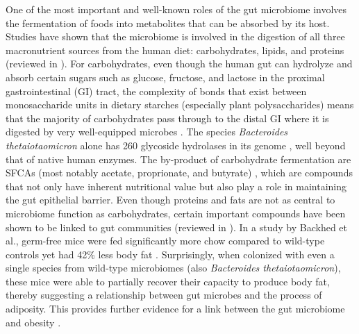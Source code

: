 One of the most important and well-known roles of the gut microbiome involves the fermentation of foods into metabolites that can be absorbed by its host. Studies have shown that the microbiome is involved in the digestion of all three macronutrient sources from the human diet: carbohydrates, lipids, and proteins (reviewed in \cite{oliphant2019macronutrient}). For carbohydrates, even though the human gut can hydrolyze and absorb certain sugars such as glucose, fructose, and lactose in the proximal gastrointestinal (GI) tract, the complexity of bonds that exist between monosaccharide units in dietary starches (especially plant polysaccharides) means that the majority of carbohydrates pass through to the distal GI where it is digested by very well-equipped microbes \cite{wong2006colonic}. The species \emph{Bacteroides thetaiotaomicron} alone has 260 glycoside hydrolases in its genome \cite{xu2003genomic}, well beyond that of native human enzymes. The by-product of carbohydrate fermentation are SFCAs (most notably acetate, proprionate, and butyrate) \cite{macfarlane2012bacteria}, which are compounds that not only have inherent nutritional value but also play a role in maintaining the gut epithelial barrier. Even though proteins and fats are not as central to microbiome function as carbohydrates, certain important compounds have been shown to be linked to gut communities (reviewed in \cite{morowitz2011contributions}). In a study by Backhed et al., germ-free mice were fed significantly more chow compared to wild-type controls yet had 42\% less body fat \cite{backhed2004gut}. Surprisingly, when colonized with even a single species from wild-type microbiomes (also \emph{Bacteroides thetaiotaomicron}), these mice were able to partially recover their capacity to produce body fat, thereby suggesting a relationship between gut microbes and the process of adiposity. This provides further evidence for a link between the gut microbiome and obesity \cite{turnbaugh2009core}. 


